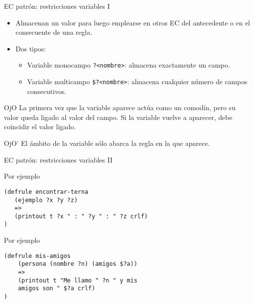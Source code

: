 \documentclass[usenames,dvipsnames,aspectratio=169]{beamer}
\begin{document}
\begin{frame}{EC patrón: restricciones variables I}
	\begin{minipage}{.45\textwidth}
	\begin{itemize}
		\item Almacenan un valor para luego emplearse en otros EC del antecedente o en el consecuente de una regla.
		\item Dos tipos:
		\begin{itemize}
			\item Variable monocampo \texttt{?<nombre>}: almacena exactamente un campo.
			\item Variable multicampo \texttt{\$?<nombre>}: almacena cualquier número de campos consecutivos.
		\end{itemize}
	\end{itemize}
	\end{minipage}
	\hfill
	\begin{minipage}{.45\textwidth}
		\begin{block}{OjO}
			La primera vez que la variable aparece actúa como un comodín, pero su valor queda ligado al valor del campo. Si la variable vuelve a aparecer, debe coincidir el valor ligado.
		\end{block}
		\begin{block}{OjO'}
			El ámbito de la variable sólo abarca la regla en la que aparece.
		\end{block}
	\end{minipage}
\end{frame}

\begin{frame}[fragile]{EC patrón: restricciones variables II}
	\small
	\begin{minipage}{.45\textwidth}
		\begin{exampleblock}{Por ejemplo}
			\begin{verbatim}
(defrule encontrar-terna
   (ejemplo ?x ?y ?z)
   =>
   (printout t ?x " : " ?y " : " ?z crlf)
)
			\end{verbatim}
		\end{exampleblock}
	\end{minipage}
	\hfill
	\begin{minipage}{.45\textwidth}
		\begin{exampleblock}{Por ejemplo}
			\begin{verbatim}
(defrule mis-amigos
    (persona (nombre ?n) (amigos $?a))
    =>
    (printout t "Me llamo " ?n " y mis
    amigos son " $?a crlf)
)
			\end{verbatim}
		\end{exampleblock}
	\end{minipage}
\end{frame}
\end{document}

